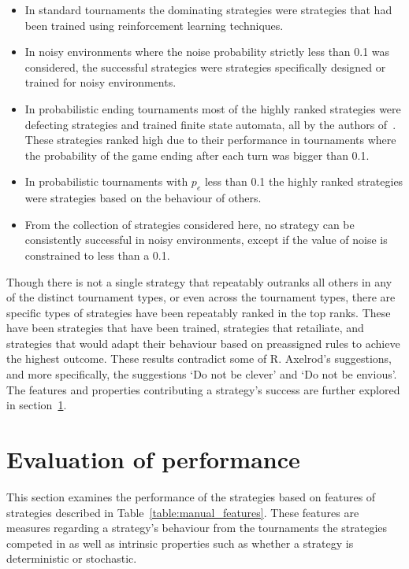 \begin{itemize}
    \item In standard tournaments the dominating strategies were
    strategies that had been trained using reinforcement learning techniques.
    \item In noisy environments where the noise probability strictly less than
    0.1 was considered, the successful strategies were strategies specifically
    designed or trained for noisy environments.
    \item In probabilistic ending tournaments most of the highly ranked
    strategies were defecting strategies and trained finite state automata, all
    by the authors of~\cite{Ashlock2006, Ashlock2014}. These strategies ranked
    high due to their performance in tournaments where the probability of the
    game ending after each turn was bigger than 0.1.
    \item In probabilistic tournaments with \(p_e\) less than 0.1 the highly
    ranked strategies were strategies based on the behaviour of others.
    \item From the collection of strategies considered here,  no strategy can be
    consistently successful in noisy environments, except if the value of noise
    is constrained to less than a 0.1.
\end{itemize}

Though there is not a single strategy that repeatably outranks all others in any
of the distinct tournament types, or even across the tournament types, there
are specific types of strategies have been repeatably ranked in the top ranks.
These have been strategies that have been trained, strategies that retailiate,
and strategies that would adapt their behaviour based on preassigned rules
to achieve the highest outcome. These results contradict some of R. Axelrod's suggestions,
and more specifically, the suggestions `Do not be clever' and `Do not be envious'.
The features and properties contributing a strategy's success are further
explored in section~\ref{section:evaluation_of_performance}.

\section{Evaluation of performance}\label{section:evaluation_of_performance}

This section examines the performance of the strategies based on features of strategies described in
Table~\ref{table:manual_features}. These features are measures regarding a
strategy's behaviour from the tournaments the strategies competed in as well as
intrinsic properties such as whether a strategy is deterministic or stochastic.

